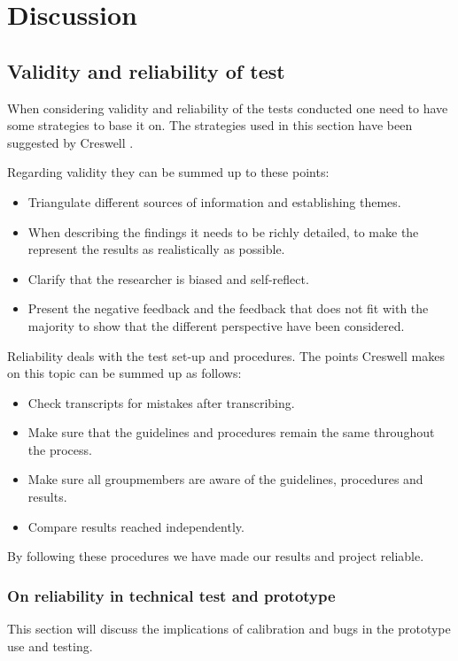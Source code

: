 \chapter{Discussion}\label{ch:discussion}

\section{Validity and reliability of test}
When considering validity and reliability of the tests conducted one need to have some strategies to base it on. The strategies used in this section have been suggested by Creswell \citep{Creswell}.

Regarding validity they can be summed up to these points:
\begin{itemize}
\item Triangulate different sources of information and establishing themes.
\item When describing the findings it needs to be richly detailed, to make the represent the results as realistically as possible.
\item Clarify that the researcher is biased and self-reflect.
\item Present the negative feedback and the feedback that does not fit with the majority to show that the different perspective have been considered.
\end{itemize}


Reliability deals with the test set-up and procedures. The points Creswell \citep{Creswell} makes on this topic can be summed up as follows:

\begin{itemize}
\item Check transcripts for mistakes after transcribing.
\item Make sure that the guidelines and procedures remain the same throughout the process.
\item Make sure all groupmembers are aware of the guidelines, procedures and results. 
\item Compare results reached independently.
\end{itemize}

By following these procedures we have made our results and project reliable. 


\subsection{On reliability in technical test and prototype}
This section will discuss the implications of calibration and bugs in the prototype use and testing. 
